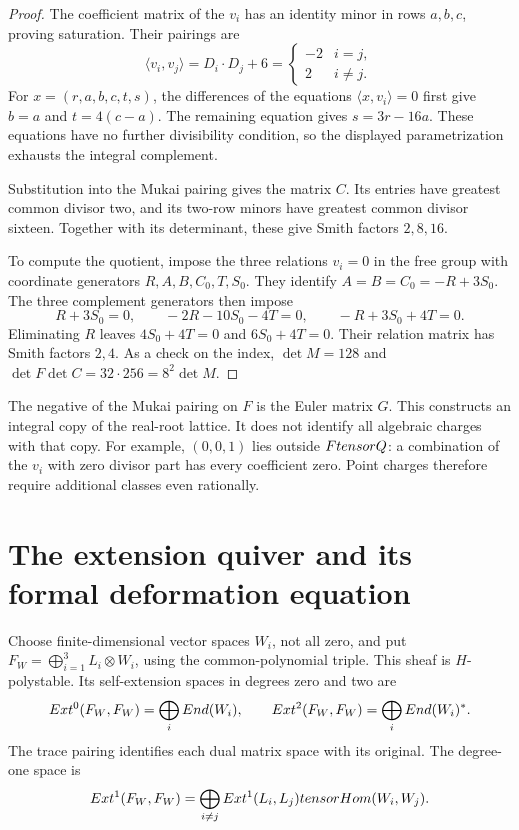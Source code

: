 \begin{proof}
The coefficient matrix of the $v_i$ has an identity minor in rows
$a,b,c$, proving saturation.  Their pairings are
\[
\langle v_i,v_j\rangle=D_i\cdot D_j+6
=\begin{cases}-2&i=j,\\2&i\ne j.\end{cases}
\]
For $x=(r,a,b,c,t,s)$, the differences of the equations
$\langle x,v_i\rangle=0$ first give $b=a$ and $t=4(c-a)$.
The remaining equation gives $s=3r-16a$.  These equations have no
further divisibility condition, so the displayed parametrization
exhausts the integral complement.

Substitution into the Mukai pairing gives the matrix $C$.  Its
entries have greatest common divisor two, and its two-row minors
have greatest common divisor sixteen.  Together with its determinant,
these give Smith factors $2,8,16$.

To compute the quotient, impose the three relations $v_i=0$ in the
free group with coordinate generators $R,A,B,C_0,T,S_0$.
They identify $A=B=C_0=-R+3S_0$.  The three complement generators
then impose
\[
R+3S_0=0,\qquad -2R-10S_0-4T=0,
\qquad -R+3S_0+4T=0.
\]
Eliminating $R$ leaves $4S_0+4T=0$ and $6S_0+4T=0$.
Their relation matrix has Smith factors $2,4$.
As a check on the index, $\det M=128$ and
$\det F\det C=32\cdot256=8^2\det M$.
\end{proof}

The negative of the Mukai pairing on $F$ is the Euler matrix $G$.
This constructs an integral copy of the real-root lattice.  It does
not identify all algebraic charges with that copy.  For example,
$(0,0,1)$ lies outside $FtensorQ$: a combination of the $v_i$
with zero divisor part has every coefficient zero.  Point charges
therefore require additional classes even rationally.

\section{The extension quiver and its formal deformation equation}
\label{k3:sec:formal-quiver}

Choose finite-dimensional vector spaces $W_i$, not all zero, and put
$F_W=\bigoplus_{i=1}^3L_i\otimes W_i$, using the common-polynomial
triple.  This sheaf is $H$-polystable.  Its self-extension spaces in
degrees zero and two are
\[
Ext^0(F_W,F_W)=\bigoplus_iEnd(W_i),\qquad
Ext^2(F_W,F_W)=\bigoplus_iEnd(W_i)^*.
\]
The trace pairing identifies each dual matrix space with its original.
The degree-one space is
\[
Ext^1(F_W,F_W)
=\bigoplus_{i\ne j}Ext^1(L_i,L_j)tensorHom(W_i,W_j).
\]

